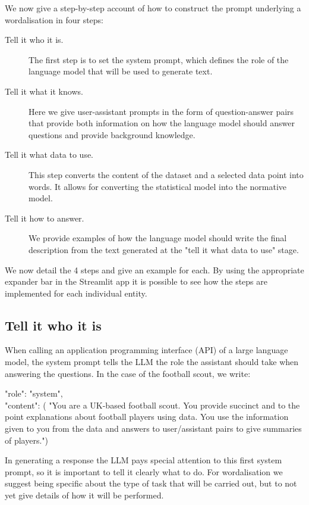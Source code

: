\documentclass{article}
\begin{document}
We now give a step-by-step account of how to construct the prompt underlying a wordalisation in four steps:
\begin{description}
    \item[Tell it who it is.] {The first step is to set the system prompt, which defines the role of the language model that will be used to generate text.}
    \item[Tell it what it knows.] {Here we give user-assistant prompts in the form of question-answer pairs that provide both information on how the language model should answer questions and provide background knowledge.}
    \item[Tell it what data to use.] {This step converts the content of the dataset and a selected data point into words. It allows for converting the statistical model into the normative model. }
    \item[Tell it how to answer.] {We provide examples of how the language model should write the final description from the text generated at the "tell it what data to use" stage.}
\end{description}

We now detail the 4 steps and give an example for each. By using the appropriate expander bar in the Streamlit app it is possible to see how the steps are implemented for each individual entity.

\subsection{Tell it who it is}

When calling an application programming interface (API) of a large language model, the system prompt tells the LLM the role the assistant should take when answering the questions. In the case of the football scout, we write:

\begin{tcolorbox}[colback=white, colframe=black, rounded corners]
"role": "system",\\
"content": ( "You are a UK-based football scout. You provide succinct and 
to the point explanations about football players using data. You use the 
information given to you from the data and answers to user/assistant pairs 
to give summaries of players.") 
\end{tcolorbox}

In generating a response the LLM pays special attention to this first system prompt, so it is important to tell it clearly what to do. For wordalisation we suggest being specific about the type of task that will be carried out, but to not yet give details of how it will be performed.
\end{document}
